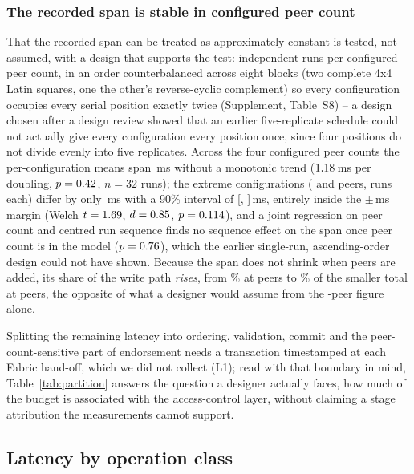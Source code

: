\documentclass[a4paper,fleqn]{cas-sc}
\begin{document}


\subsubsection{The recorded span is stable in configured peer count}
\label{subsubsec:acinvariance}

That the recorded span can be treated as approximately constant is tested,
not assumed, with a design that supports the test: \PartRunsPerConfig{}
independent runs per configured peer count, in an order counterbalanced
across eight blocks (two complete 4x4 Latin squares, one the other's
reverse-cyclic complement) so every configuration occupies every serial
position exactly twice (Supplement, Table~S8) -- a design chosen after a
  design review showed that an earlier five-replicate schedule could not
actually give every configuration every position once, since four
positions do not divide evenly into five replicates. Across the four
configured peer counts the per-configuration means span \PartSpread\,ms
without a monotonic trend ($1.18$\,ms per doubling,
$p=0.42$, $n=32$ runs); the extreme configurations (\ScaleMinPeers{}
and \ScaleMaxPeers{} peers, \PartRunsPerConfig{} runs each) differ by only
\PartTostDiff\,ms with a 90\% interval of [\PartTostLow,
\PartTostHigh]\,ms, entirely inside the $\pm$\DecisionMargin\,ms margin
(Welch $t=1.69$, $d=0.85$, $p=0.114$), and a
joint regression on peer count and centred run sequence finds no sequence
effect on the span once peer count is in the model
($p=0.76$), which the earlier single-run, ascending-order
design could not have shown. Because the span does not shrink when peers
are added, its share of the write path \emph{rises}, from
\PartAccessPct\% at \ScaleMinPeers{} peers to \PartAccessPctAtMax\% of the
smaller total at \ScaleMaxPeers{} peers, the opposite of what a designer
would assume from the \ScaleMinPeers-peer figure alone.

Splitting the remaining latency into ordering, validation, commit and the
peer-count-sensitive part of endorsement needs a transaction timestamped at
each Fabric hand-off, which we did not collect (L1); read with that
boundary in mind, Table~\ref{tab:partition} answers the question a designer
actually faces, how much of the budget is associated with the
access-control layer, without claiming a stage attribution the
measurements cannot support.

\subsection{Latency by operation class}
\label{subsec:byclass}
\end{document}

